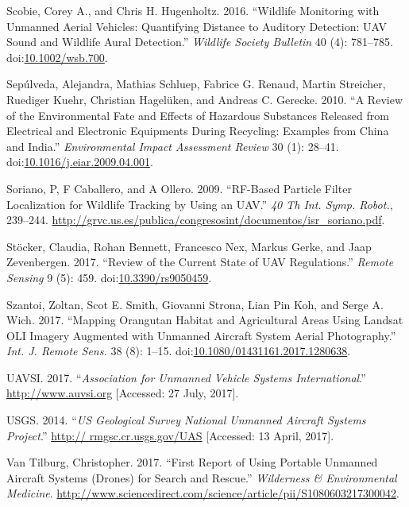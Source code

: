 \documentclass[]{interact}
\theoremstyle{plain}%
\theoremstyle{definition}
\theoremstyle{remark}
\begin{document}
\hypertarget{ref-scobie_wildlife_2016}{}
Scobie, Corey A., and Chris H. Hugenholtz. 2016. ``Wildlife Monitoring
with Unmanned Aerial Vehicles: Quantifying Distance to Auditory
Detection: UAV Sound and Wildlife Aural Detection.'' \emph{Wildlife
Society Bulletin} 40 (4): 781--785.
doi:\href{https://doi.org/10.1002/wsb.700}{10.1002/wsb.700}.

\hypertarget{ref-sepulveda_review_2010}{}
Sepúlveda, Alejandra, Mathias Schluep, Fabrice G. Renaud, Martin
Streicher, Ruediger Kuehr, Christian Hagelüken, and Andreas C. Gerecke.
2010. ``A Review of the Environmental Fate and Effects of Hazardous
Substances Released from Electrical and Electronic Equipments During
Recycling: Examples from China and India.'' \emph{Environmental Impact
Assessment Review} 30 (1): 28--41.
doi:\href{https://doi.org/10.1016/j.eiar.2009.04.001}{10.1016/j.eiar.2009.04.001}.

\hypertarget{ref-soriano_rf-based_2009}{}
Soriano, P, F Caballero, and A Ollero. 2009. ``RF-Based Particle Filter
Localization for Wildlife Tracking by Using an UAV.'' \emph{40 Th Int.
Symp. Robot.}, 239--244.
\url{http://grvc.us.es/publica/congresosint/documentos/isr_soriano.pdf}.

\hypertarget{ref-stocker_review_2017}{}
Stöcker, Claudia, Rohan Bennett, Francesco Nex, Markus Gerke, and Jaap
Zevenbergen. 2017. ``Review of the Current State of UAV Regulations.''
\emph{Remote Sensing} 9 (5): 459.
doi:\href{https://doi.org/10.3390/rs9050459}{10.3390/rs9050459}.

\hypertarget{ref-szantoi_mapping_2017}{}
Szantoi, Zoltan, Scot E. Smith, Giovanni Strona, Lian Pin Koh, and Serge
A. Wich. 2017. ``Mapping Orangutan Habitat and Agricultural Areas Using
Landsat OLI Imagery Augmented with Unmanned Aircraft System Aerial
Photography.'' \emph{Int. J. Remote Sens.} 38 (8): 1--15.
doi:\href{https://doi.org/10.1080/01431161.2017.1280638}{10.1080/01431161.2017.1280638}.

\hypertarget{ref-AUVSI2017}{}
UAVSI. 2017. ``\emph{Association for Unmanned Vehicle Systems
International}.'' \url{http://www.auvsi.org} {[}Accessed: 27 July,
2017{]}.

\hypertarget{ref-USGS2014}{}
USGS. 2014. ``\emph{US Geological Survey National Unmanned Aircraft
Systems Project}.''
\href{http://\%20rmgsc.cr.usgs.gov/UAS}{http:// rmgsc.cr.usgs.gov/UAS}
{[}Accessed: 13 April, 2017{]}.

\hypertarget{ref-van_tilburg_first_2017}{}
Van Tilburg, Christopher. 2017. ``First Report of Using Portable
Unmanned Aircraft Systems (Drones) for Search and Rescue.''
\emph{Wilderness \& Environmental Medicine}.
\url{http://www.sciencedirect.com/science/article/pii/S1080603217300042}.
\end{document}
